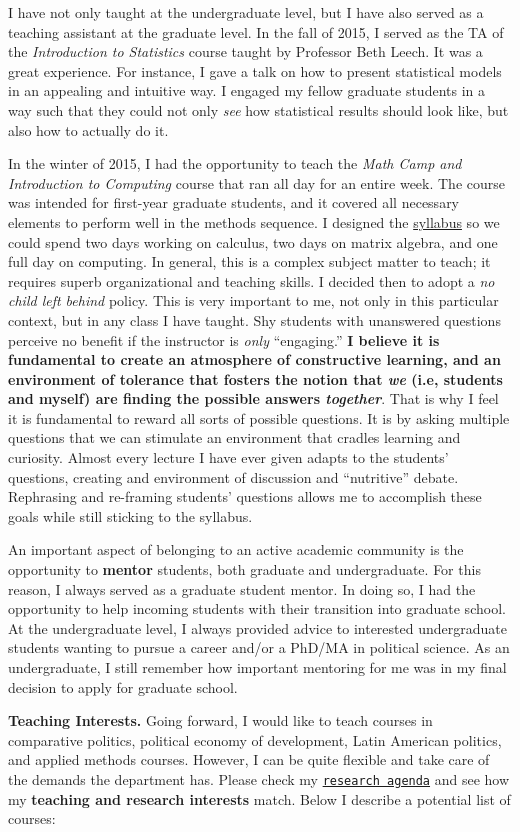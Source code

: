 I have not only taught at the undergraduate level, but I have also served as a teaching assistant at the graduate level. In the fall of 2015, I served as the TA of the \emph{Introduction to Statistics} course taught by Professor Beth Leech. It was a great experience. For instance, I gave a talk on how to present statistical models in an appealing and intuitive way. I engaged my fellow graduate students in a way such that they could not only \emph{see} how statistical results should look like, but also how to actually do it. 

In the winter of 2015, I had the opportunity to teach the \emph{Math Camp and Introduction to Computing} course that ran all day for an entire week. The course was intended for first-year graduate students, and it covered all necessary elements to perform well in the methods sequence. I designed the \href{https://github.com/hbahamonde/Math-Camp/raw/master/Syllabus/Math_Camp_Syllabus.pdf}{syllabus} so we could spend two days working on calculus, two days on matrix algebra, and one full day on computing. In general, this is a complex subject matter to teach; it requires superb organizational and teaching skills. I decided then to adopt a \emph{no child left behind} policy. This is very important to me, not only in this particular context, but in any class I have taught. Shy students with unanswered questions perceive no benefit if the instructor is \emph{only} ``engaging.'' {\bf I believe it is fundamental to create an atmosphere of constructive learning, and an environment of tolerance that fosters the notion that \emph{we} (i.e, students and myself) are finding the possible answers \emph{together}}. That is why I feel it is fundamental to reward all sorts of possible questions. It is by asking multiple questions that we can stimulate an environment that cradles learning and curiosity. Almost every lecture I have ever given adapts to the students' questions, creating and environment of discussion and ``nutritive'' debate. Rephrasing and re-framing students' questions allows me to accomplish these goals while still sticking to the syllabus. 

An important aspect of belonging to an active academic community is the opportunity to {\bf mentor} students, both graduate and undergraduate. For this reason, I always served as a graduate student mentor. In doing so, I had the opportunity to help incoming students with their transition into graduate school. At the undergraduate level, I always provided advice to interested undergraduate students wanting to pursue a career and/or a PhD/MA in political science. As an undergraduate, I still remember how important mentoring for me was in my final decision to apply for graduate school.

{\bf Teaching Interests.} Going forward, I would like to teach courses in comparative politics, political economy of development, Latin American politics, and applied methods courses. However, I can be quite flexible and take care of the demands the department has. Please check my \href{http://www.hectorbahamonde.com/research/}{\texttt{research agenda}} and see how my {\bf teaching and research interests} match. Below I describe a potential list of courses:
